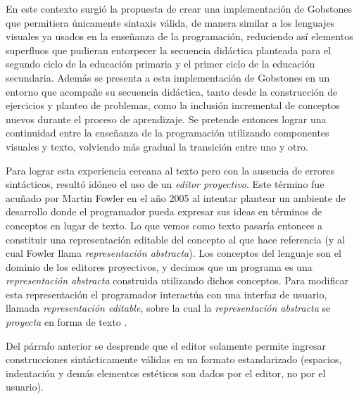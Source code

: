 En este contexto surgió la propuesta de crear una implementación de Gobstones que permitiera únicamente sintaxis válida, de manera similar a los lenguajes visuales ya usados en la enseñanza de la programación, reduciendo así elementos superfluos que pudieran entorpecer la secuencia didáctica planteada para el segundo ciclo de la educación primaria y el primer ciclo de la educación secundaria.
Además se presenta a esta implementación de Gobstones en un entorno que acompañe su secuencia didáctica, tanto desde la construcción de ejercicios y planteo de problemas, como la inclusión incremental de conceptos nuevos durante el proceso de aprendizaje. Se pretende entonces lograr una continuidad entre la enseñanza de la programación utilizando componentes visuales y texto, volviendo más gradual la transición entre uno y otro.


Para lograr esta experiencia cercana al texto pero con la ausencia de errores sintácticos, resultó idóneo el uso de un \emph{editor proyectivo}. Este término fue acuñado por Martin Fowler en el año 2005 \cite{Fowler} al intentar plantear un ambiente de desarrollo donde el programador pueda expresar sus ideas en términos de conceptos en lugar de texto. Lo que vemos como texto pasaría entonces a constituir una representación editable del concepto al que hace referencia (y al cual Fowler llama \textit{representación abstracta}). Los conceptos del lenguaje son el dominio de los editores proyectivos, y decimos que un programa es una \textit{representación abstracta} construida utilizando dichos conceptos. Para modificar esta representación el programador interactúa con una interfaz de usuario, llamada \textit{representación editable}, sobre la cual la \textit{representación abstracta} se \textit{proyecta} en forma de texto \cite{voelter2014projectional}. 

Del párrafo anterior se desprende que el editor solamente permite ingresar construcciones sintácticamente válidas en un formato estandarizado (espacios, indentación y demás elementos estéticos son dados por el editor, no por el usuario).

